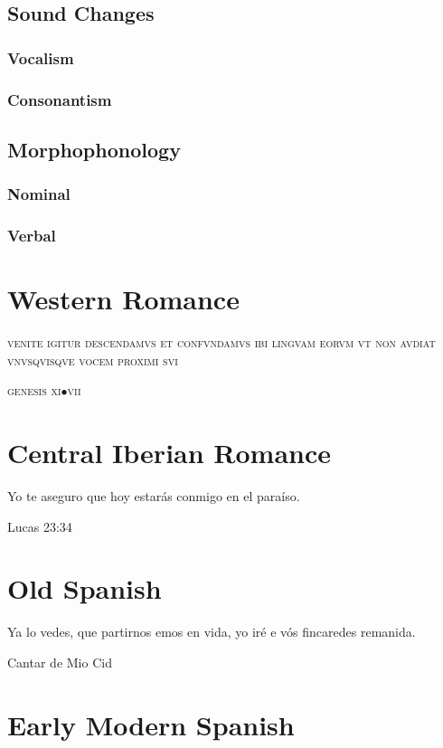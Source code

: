 \documentclass{report}
\begin{document}
\section{Sound Changes}

\subsection{Vocalism}

\subsection{Consonantism}

\section{Morphophonology}

\subsection{Nominal}

\subsection{Verbal}

\chapter{Western Romance}

\epigraph{\textsc{venite igitur descendamvs et confvndamvs ibi lingvam eorvm vt non avdiat vnvsqvisqve vocem proximi svi}}{\textsc{genesis} \textsc{xi}$\bullet$\textsc{vii}}

\chapter{Central Iberian Romance}

\epigraph{Yo te aseguro que hoy estarás conmigo en el paraíso.}{Lucas 23:34}

\chapter{Old Spanish}

\epigraph{Ya lo vedes, que partirnos emos en vida,
yo iré e vós fincaredes remanida.}{Cantar de Mio Cid}

\chapter{Early Modern Spanish}
\end{document}
